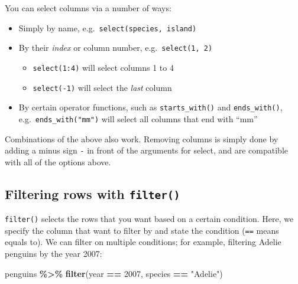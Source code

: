 \documentclass[
]{book}
\newenvironment{Shaded}{\begin{snugshade}}{\end{snugshade}}
\newcommand{\DecValTok}[1]{\textcolor[rgb]{0.00,0.00,0.81}{#1}}
\newcommand{\FunctionTok}[1]{\textcolor[rgb]{0.13,0.29,0.53}{\textbf{#1}}}
\newcommand{\NormalTok}[1]{#1}
\newcommand{\SpecialCharTok}[1]{\textcolor[rgb]{0.81,0.36,0.00}{\textbf{#1}}}
\newcommand{\StringTok}[1]{\textcolor[rgb]{0.31,0.60,0.02}{#1}}
\providecommand{\tightlist}{%
  \setlength{\itemsep}{0pt}\setlength{\parskip}{0pt}}
\begin{document}
You can select columns via a number of ways:

\begin{itemize}
\tightlist
\item
  Simply by name, e.g.~\texttt{select(species,\ island)}
\item
  By their \emph{index} or column number, e.g.~\texttt{select(1,\ 2)}

  \begin{itemize}
  \tightlist
  \item
    \texttt{select(1:4)} will select columns 1 to 4
  \item
    \texttt{select(-1)} will select the \emph{last} column
  \end{itemize}
\item
  By certain operator functions, such as \texttt{starts\_with()} and \texttt{ends\_with()}, e.g.~\texttt{ends\_with("mm")} will select all columns that end with ``mm''
\end{itemize}

Combinations of the above also work. Removing columns is simply done by adding a minus sign \texttt{-} in front of the arguments for select, and are compatible with all of the options above.

\subsection{\texorpdfstring{Filtering rows with \texttt{filter()}}{Filtering rows with filter()}}\label{filtering-rows-with-filter}

\texttt{filter()} selects the rows that you want based on a certain condition. Here, we specify the column that want to filter by and state the condition (\texttt{==} means equals to). We can filter on multiple conditions; for example, filtering Adelie penguins by the year 2007:

\begin{Shaded}
\begin{Highlighting}[]
\NormalTok{penguins }\SpecialCharTok{\%\textgreater{}\%}
  \FunctionTok{filter}\NormalTok{(year }\SpecialCharTok{==} \DecValTok{2007}\NormalTok{, species }\SpecialCharTok{==} \StringTok{"Adelie"}\NormalTok{)}
\end{Highlighting}
\end{Shaded}
\end{document}

